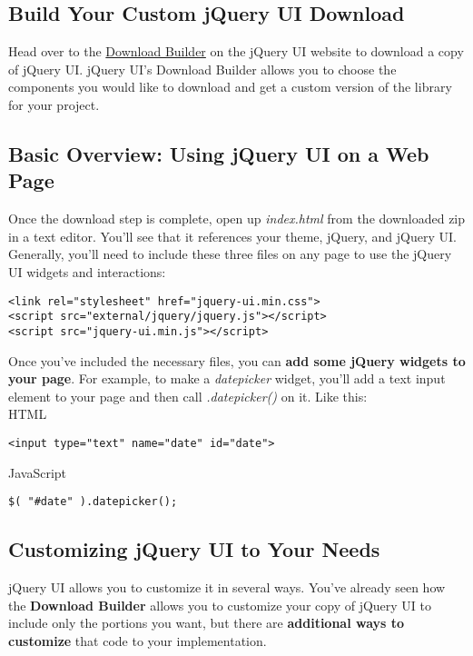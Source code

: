 \documentclass[10pt,letterpaper]{report}
\begin{document}
\subsection{Build Your Custom jQuery UI Download}
Head over to the \href{http://jqueryui.com/download/}{Download Builder} on the jQuery UI website to download a copy of jQuery UI. jQuery UI's Download Builder allows you to choose the components you would like to download and get a custom version of the library for your project.
\subsection{Basic Overview: Using jQuery UI on a Web Page}
Once the download step is complete, open up \textit{index.html} from the downloaded zip in a text editor. You'll see that it references your theme, jQuery, and jQuery UI. Generally, you'll need to include these three files on any page to use the jQuery UI widgets and interactions:

\lstset{language=HTML}
\begin{lstlisting}
<link rel="stylesheet" href="jquery-ui.min.css">
<script src="external/jquery/jquery.js"></script>
<script src="jquery-ui.min.js"></script>
\end{lstlisting}
Once you've included the necessary files, you can \textbf{add some jQuery widgets to your page}. For example, to make a \textit{datepicker} widget, you'll add a text input element to your page and then call \textit{.datepicker()} on it. Like this:\\
HTML
\lstset{language=HTML}
\begin{lstlisting}
<input type="text" name="date" id="date">
\end{lstlisting}
JavaScript
\lstset{language=JavaScript}
\begin{lstlisting}
$( "#date" ).datepicker();
\end{lstlisting}
\subsection{Customizing jQuery UI to Your Needs}
jQuery UI allows you to customize it in several ways. You've already seen how the \textbf{Download Builder} allows you to customize your copy of jQuery UI to include only the portions you want, but there are \textbf{additional ways to customize} that code to your implementation.
\end{document}
